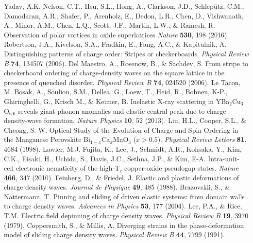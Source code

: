 \documentclass[12pt]{article}
\begin{document}
\begin{thebibliography}{99}
    Yadav, A.K. Nelson, C.T., Hsu, S.L., Hong, A., Clarkson, J.D., Schlep\"{u}tz, C.M., Damodaran, A.R., Shafer, P., Arenholz, E., Dedon, L.R., Chen, D., Vishwanath, A., Minor, A.M., Chen, L.Q., Scott, J.F., Martin, L.W., \& Ramesh, R. Observation of polar vortices in oxide superlattices \textit{Nature} \textbf{530}, 198 (2016).
    Robertson, J.A., Kivelson, S.A., Fradkin, E., Fang, A.C., \& Kapitulnik, A. Distinguishing patterns of charge order: Stripes or checkerboards. \textit{Physical Review B} \textbf{74}, 134507 (2006).
    Del Maestro, A., Rosenow, B., \& Sachdev, S. From stripe to checkerboard ordering of charge-density waves on the square lattice in the presence of quenched disorder. \textit{Physical Review B} \textbf{74}, 024520 (2006).
    Le Tacon, M. Bosak, A., Souliou, S.M., Dellea, G., Loew, T., Heid, R., Bohnen, K-P., Ghiringhelli, G., Krisch M., \& Keimer, B. Inelastic X-ray scattering in YBa$_2$Cu$_3$O$_{6.6}$ reveals giant phonon anomalies and elastic central peak due to charge-density-wave formation. \textit{Nature Physics} \textbf{10}, 52 (2013).
    Liu, H.L., Cooper, S.L., \& Cheong, S.-W. Optical Study of the Evolution of Charge and Spin Ordering in the Manganese Perovskite Bi$_{1-x}$Ca$_x$MnO$_3$ ($x > 0.5$). \textit{Physical Review Letters} \textbf{81}, 4684 (1998).
    Lawler, M.J. Fujita, K., Lee, J., Schmidt, A.R., Kohsaka, Y., Kim, C.K., Eisaki, H., Uchida, S., Davis, J.C., Sethna, J.P., \& Kim, E-A. Intra-unit-cell electronic nematicity of the high-T$_c$ copper-oxide pseudogap states. \textit{Nature} \textbf{466}, 347 (2010).
    Feinberg, D., \& Friedel, J. Elastic and plastic deformations of charge density waves. \textit{Journal de Physique} \textbf{49}, 485 (1988).
     Brazovskii, S., \& Nattermann, T. Pinning and sliding of driven elastic systems: from domain walls to charge density waves. \textit{Advances in Physics} \textbf{53}, 177 (2004).
     Lee, P.A., \& Rice, T.M. Electric field depinning of charge density waves. \textit{Physical Review B} \textbf{19}, 3970 (1979).
     Coppersmith, S., \& Millis, A. Diverging strains in the phase-deformation model of sliding charge density waves. \textit{Physical Review B} \textbf{44}, 7799 (1991).
\end{thebibliography}


\end{document}
